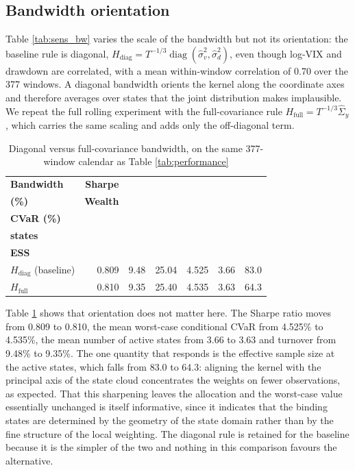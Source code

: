 \documentclass[smallcondensed]{svjour3}
\begin{document}
\subsection{Bandwidth orientation}\label{sec:bwgeom}
Table \ref{tab:sens_bw} varies the scale of the bandwidth but not its orientation: the baseline rule is diagonal, $H_{\mathrm{diag}} = T^{-1/3}\operatorname{diag}(\hat{\sigma}^2_{v}, \hat{\sigma}^2_{d})$, even though log-VIX and drawdown are correlated, with a mean within-window correlation of 0.70 over the 377 windows. A diagonal bandwidth orients the kernel along the coordinate axes and therefore averages over states that the joint distribution makes implausible. We repeat the full rolling experiment with the full-covariance rule $H_{\mathrm{full}} = T^{-1/3}\hat{\Sigma}_y$, which carries the same scaling and adds only the off-diagonal term.

\begin{table}[!htbp]
\centering
\caption{Diagonal versus full-covariance bandwidth, on the same 377-window calendar as Table \ref{tab:performance}}
\label{tab:bwgeom}
\small
\begin{tabular}{lrrrrrr}
\toprule
\textbf{Bandwidth} & \textbf{Sharpe} & \makecell[r]{\textbf{Turn.}\\\textbf{(\%)}} & \textbf{Wealth} & \makecell[r]{\textbf{Worst}\\\textbf{CVaR (\%)}} & \makecell[r]{\textbf{Active}\\\textbf{states}} & \makecell[r]{\textbf{Mean}\\\textbf{ESS}} \\
\midrule
$H_{\mathrm{diag}}$ (baseline) & 0.809 & 9.48 & 25.04 & 4.525 & 3.66 & 83.0 \\
$H_{\mathrm{full}}$ & 0.810 & 9.35 & 25.40 & 4.535 & 3.63 & 64.3 \\
\bottomrule
\end{tabular}
\end{table}

Table \ref{tab:bwgeom} shows that orientation does not matter here. The Sharpe ratio moves from 0.809 to 0.810, the mean worst-case conditional CVaR from 4.525\% to 4.535\%, the mean number of active states from 3.66 to 3.63 and turnover from 9.48\% to 9.35\%. The one quantity that responds is the effective sample size at the active states, which falls from 83.0 to 64.3: aligning the kernel with the principal axis of the state cloud concentrates the weights on fewer observations, as expected. That this sharpening leaves the allocation and the worst-case value essentially unchanged is itself informative, since it indicates that the binding states are determined by the geometry of the state domain rather than by the fine structure of the local weighting. The diagonal rule is retained for the baseline because it is the simpler of the two and nothing in this comparison favours the alternative.
\end{document}
